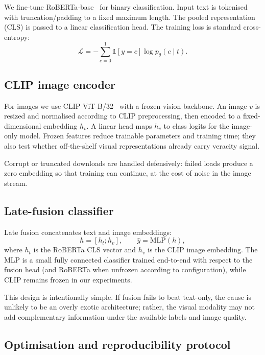 \documentclass[12pt, a4paper]{report}
\begin{document}
We fine-tune RoBERTa-base~\cite{liu2019roberta} for binary classification.
Input text is tokenised with truncation/padding to a fixed maximum length.
The pooled representation (CLS) is passed to a linear classification head.
The training loss is standard cross-entropy:
\begin{equation}
\mathcal{L} = -\sum_{c=0}^{1} \mathbb{1}[y=c]\log p_\theta(c\mid t).
\end{equation}

\subsection{CLIP image encoder}

For images we use CLIP ViT-B/32~\cite{radford2021clip} with a frozen vision backbone.
An image $v$ is resized and normalised according to CLIP preprocessing, then encoded to a fixed-dimensional embedding $h_v$.
A linear head maps $h_v$ to class logits for the image-only model.
Frozen features reduce trainable parameters and training time; they also test whether off-the-shelf visual representations already carry veracity signal.

Corrupt or truncated downloads are handled defensively: failed loads produce a zero embedding so that training can continue, at the cost of noise in the image stream.

\subsection{Late-fusion classifier}

Late fusion concatenates text and image embeddings:
\begin{equation}
h = [h_t; h_v], \qquad
\hat{y} = \mathrm{MLP}(h),
\end{equation}
where $h_t$ is the RoBERTa CLS vector and $h_v$ is the CLIP image embedding.
The MLP is a small fully connected classifier trained end-to-end with respect to the fusion head (and RoBERTa when unfrozen according to configuration), while CLIP remains frozen in our experiments.

This design is intentionally simple.
If fusion fails to beat text-only, the cause is unlikely to be an overly exotic architecture; rather, the visual modality may not add complementary information under the available labels and image quality.

\subsection{Optimisation and reproducibility protocol}
\end{document}
